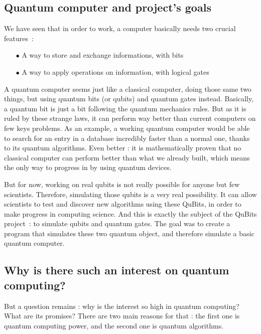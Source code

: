 \documentclass[a4paper,12pt]{report}
\newcommand{\para}[1]{\par{#1}\\}
\begin{document}
        \subsection{Quantum computer and project's goals}

\para{
    We have seen that in order to work, a computer basically needs two crucial features :
}

\begin{itemize}
\item[$\bullet$] A way to store and exchange informations, with bits
\item[$\bullet$] A way to apply operations on information, with logical gates
\end{itemize}

\para{
    A quantum computer seems just like a classical computer, doing those same two things, but using quantum bits (or qubits) and quantum gates instead. Basically, a quantum bit is just a bit following the quantum mechanics rules. But as it is ruled by these strange laws, it can perform way better than current computers on few keys problems. As an example, a working quantum computer would be able to search for an entry in a database incredibly faster than a normal one, thanks to its quantum algorithms. Even better : it is mathematically proven that no classical computer can perform better than what we already built, which means the only way to progress in by using quantum devices.
}

\para{
    But for now, working on real qubits is not really possible for anyone but few scientists. Therefore, simulating those qubits is a very real possibility. It can allow scientists to test and discover new algorithms using these QuBits, in order to make progress in computing science. And this is exactly the subject of the QuBits project : to simulate qubits and quantum gates. The goal was to create a program that simulates these two quantum object, and therefore simulate a basic quantum computer.
}

        \subsection{Why is there such an interest on quantum computing?}

\para{
    But a question remains : why is the interest so high in quantum computing? What are its promises? There are two main reasons for that : the first one is quantum computing power, and the second one is quantum algorithms.
}
\end{document}
